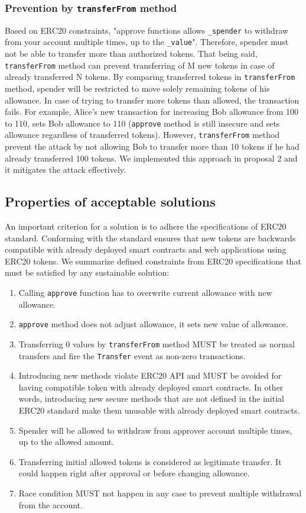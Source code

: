 \subsubsection*{Prevention by \texttt{transferFrom} method} Based on ERC20 constraints, "approve functions allows \texttt{\_spender} to withdraw from your account multiple times, up to the \texttt{\_value}". Therefore, spender must not be able to transfer more than authorized tokens. That being said, \texttt{transferFrom} method can prevent transferring of M new tokens in case of already transferred N tokens. By comparing transferred tokens in \texttt{transferFrom} method, spender will be restricted to move solely remaining tokens of his allowance. In case of trying to transfer more tokens than allowed, the transaction fails. For example, Alice's new transaction for increasing Bob allowance from 100 to 110, sets Bob allowance to 110 (\texttt{approve} method is still insecure and sets allowance regardless of transferred tokens). However, \texttt{transferFrom} method prevent the attack by not allowing Bob to transfer more than 10 tokens if he had already transferred 100 tokens. We implemented this approach in proposal 2 and it mitigates the attack effectively.

\subsection{Properties of acceptable solutions}
An important criterion for a solution is to adhere the specifications of ERC20 standard. Conforming with the standard ensures that new tokens are backwards compatible with already deployed smart contracts and web applications using ERC20 tokens. We summarize defined constraints from ERC20 specifications \cite{Ref08} that must be satisfied by any sustainable solution:

\begin{enumerate}
	\item Calling \texttt{approve} function has to overwrite current allowance with new allowance.
	\item \texttt{approve} method does not adjust allowance, it sets new value of allowance.
	\item Transferring 0 values by \texttt{transferFrom} method MUST be treated as normal transfers and fire the \texttt{Transfer} event as non-zero transactions.
	\item Introducing new methods violate ERC20 API and MUST be avoided for having compatible token with already deployed smart contracts. In other words, introducing new secure methods that are not defined in the initial ERC20 standard make them unusable with already deployed smart contracts.
	\item Spender will be allowed to withdraw from approver account multiple times, up to the allowed amount.
	\item Transferring initial allowed tokens is considered as legitimate transfer. It could happen right after approval or before changing allowance.
	\item Race condition MUST not happen in any case to prevent multiple withdrawal from the account.
\end{enumerate}